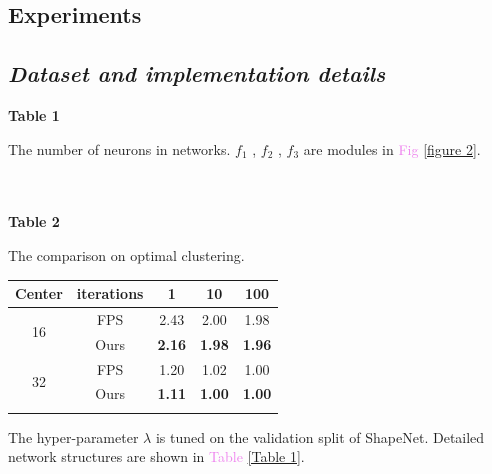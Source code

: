 \documentclass{article}
\begin{document}
\begin{multicols}{2}
\section{Experiments}
\subsection{\textit{Dataset and implementation details}}
\textbf{Table 1} \par
The number of neurons in networks. $f_1$ , $f_2$ , $f_3$ are modules in \textcolor{violet}{Fig} \ref{figure 2}.\par

\\
\\
\textbf{Table 2} \par
The comparison on optimal clustering.

\begin{tabular}{ c c c c c}
\hline
Center & iterations & 1 & 10 & 100 \\ 
\hline
\multirow{2}{*}{16} & FPS  & 2.43 & 2.00 & 1.98 \\
 & Ours & \textbf{2.16} & \textbf{1.98}  & \textbf{1.96} \\
 \multirow{2}{*}{32} & FPS  & 1.20 & 1.02 & 1.00 \\
 & Ours & \textbf{1.11} & \textbf{1.00} & \textbf{1.00}\\
 \hline
 \label{Table 2}
\end{tabular}

The hyper-parameter $\lambda$ is tuned on the validation split of ShapeNet. Detailed network structures are shown in \textcolor{violet}{Table} \ref{Table 1}.

\end{multicols}
\end{document}

